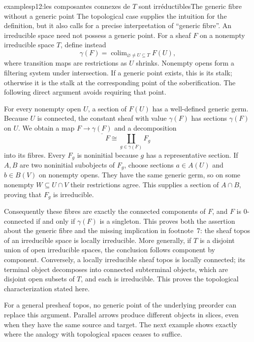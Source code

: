 \begin{dcomment}{examples}{p12:les composantes connexes de $T$ sont irréductibles}{The generic fibre without a generic point}
The topological case supplies the intuition for the definition, but it also calls for a precise interpretation of ``generic fibre''. An irreducible space need not possess a generic point. For a sheaf $F$ on a nonempty irreducible space $T$, define instead
\[
 \gamma(F)=\mathop{\operatorname{colim}}_{\varnothing\ne U\subseteq T}F(U),
\]
where transition maps are restrictions as $U$ shrinks. Nonempty opens form a filtering system under intersection. If a generic point exists, this is its stalk; otherwise it is the stalk at the corresponding point of the soberification. The following direct argument avoids requiring that point.

For every nonempty open $U$, a section of $F(U)$ has a well-defined generic germ. Because $U$ is connected, the constant sheaf with value $\gamma(F)$ has sections $\gamma(F)$ on $U$. We obtain a map $F\to\underline{\gamma(F)}$ and a decomposition
\[
 F\cong\coprod_{g\in\gamma(F)}F_g
\]
into its fibres. Every $F_g$ is noninitial because $g$ has a representative section. If $A,B$ are two noninitial subobjects of $F_g$, choose sections $a\in A(U)$ and $b\in B(V)$ on nonempty opens. They have the same generic germ, so on some nonempty $W\subseteq U\cap V$ their restrictions agree. This supplies a section of $A\cap B$, proving that $F_g$ is irreducible.

Consequently these fibres are exactly the connected components of $F$, and $F$ is $0$-connected if and only if $\gamma(F)$ is a singleton. This proves both the assertion about the generic fibre and the missing implication in footnote~7: the sheaf topos of an irreducible space is locally irreducible. More generally, if $T$ is a disjoint union of open irreducible spaces, the conclusion follows component by component. Conversely, a locally irreducible sheaf topos is locally connected; its terminal object decomposes into connected subterminal objects, which are disjoint open subsets of $T$, and each is irreducible. This proves the topological characterization stated here.

For a general presheaf topos, no generic point of the underlying preorder can replace this argument. Parallel arrows produce different objects in slices, even when they have the same source and target. The next example shows exactly where the analogy with topological spaces ceases to suffice.
\end{dcomment}

